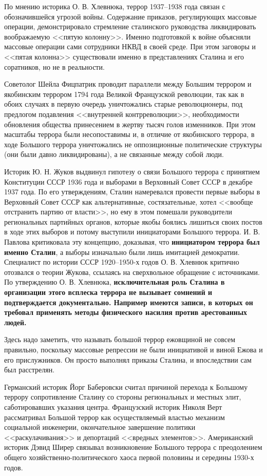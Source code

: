 \documentclass[12pt]{article}
\begin{document}
  По мнению историка О. В. Хлевнюка, террор 1937--1938 года связан с обозначившейся угрозой войны.
  Содержание приказов, регулирующих массовые операции, демонстрировало стремление сталинского руководства ликвидировать воображаемую <<пятую колонну>>.
  Именно подготовкой к войне объясняли массовые операции сами сотрудники НКВД в своей среде.
  При этом заговоры и <<пятая колонна>> существовали именно в представлениях Сталина и его соратников, но не в реальности.

  Советолог Шейла Фицпатрик проводит параллели между Большим террором и якобинским террором 1794 года Великой Французской революции, так как в обоих случаях в первую очередь уничтожались старые революционеры, под предлогом подавления <<внутренней контрреволюции>>, необходимости обновления общества принесением в жертву тысяч голов изменников.
  При этом масштабы террора были несопоставимы и, в отличие от якобинского террора, в ходе Большого террора уничтожались не оппозиционные политические структуры (они были давно ликвидированы), а не связанные между собой люди.

  Историк Ю. Н. Жуков выдвинул гипотезу о связи Большого террора с принятием Конституции СССР 1936 года и выборами в Верховный Совет СССР в декабре 1937 года.
  По его утверждениям, Сталин намеревался провести первые выборы в Верховный Совет СССР как альтернативные, состязательные, хотел <<вообще отстранить партию от власти>>, но ему в этом помешали руководители региональных партийных органов, которые якобы боялись лишиться своих постов в ходе этих выборов и потому выступили инициаторами Большого террора.
  И. В. Павлова критиковала эту концепцию, доказывая, что \textbf{инициатором террора был именно Сталин}, а выборы изначально были лишь имитацией демократии.
  Специалист по истории СССР 1920--1950-х годов О. В. Хлевнюк критично отозвался о теории Жукова, ссылаясь на сверхвольное обращение с источниками.
  По утверждению О. В. Хлевнюка, \textbf{исключительная роль Сталина в организации этого всплеска террора не вызывает сомнений и подтверждается документально.
  Например имеются записи, в которых он требовал применять методы физического насилия против арестованных людей.}

  Здесь надо заметить, что называть большой террор ежовщиной не совсем правильно,
  поскольку массовые репрессии не были инициативой и виной Ежова и его прислужников.
  Он просто выполнял приказы Сталина, и впоследствии сам был расстрелян.

  Германский историк Йорг Баберовски считал причиной перехода к Большому террору сопротивление Сталину со стороны региональных и местных элит, саботировавших указания центра.
  Французский историк Николя Верт рассматривал Большой террор как осуществляемый властью механизм социальной инженерии, окончательное завершение политики <<раскулачивания>> и депортаций <<вредных элементов>>.
  Американский историк Дэвид Ширер связывал возникновение Большого террора с преодолением общего хозяйственно-политического хаоса первой половины и середины 1930-х годов.
\end{document}
